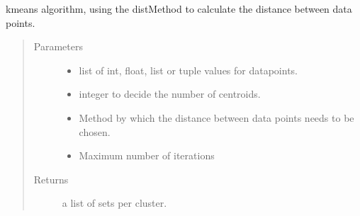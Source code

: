\documentclass[letterpaper,10pt,english]{sphinxmanual}
\begin{document}
\begin{fulllineitems}
\label{\detokenize{clustering:clustering.kMeans}}
\sphinxAtStartPar
k\sphinxhyphen{}means algorithm, using the distMethod to calculate the distance between data points.
\begin{quote}\begin{description}
\item[{Parameters}] \leavevmode\begin{itemize}
\item {} 
\sphinxAtStartPar
{} \textendash{} list of int, float, list or tuple values for datapoints.

\item {} 
\sphinxAtStartPar
{} \textendash{} integer to decide the number of centroids.

\item {} 
\sphinxAtStartPar
{} \textendash{} Method by which the distance between data points needs to be chosen.

\item {} 
\sphinxAtStartPar
{} \textendash{} Maximum number of iterations

\end{itemize}

\item[{Returns}] \leavevmode
\sphinxAtStartPar
a list of sets per cluster.

\end{description}\end{quote}

\end{fulllineitems}

\end{document}
